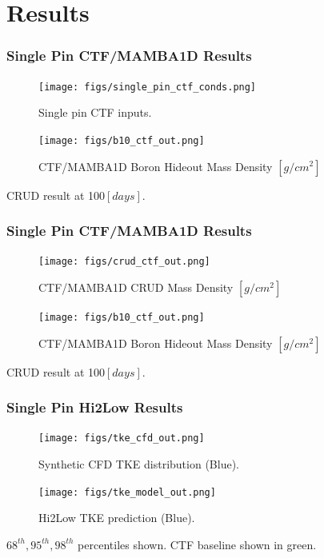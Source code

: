\documentclass[t, pdftex]{beamer}
\begin{document}
\section{Results}
\begin{frame}\frametitle{Single Pin CTF/MAMBA1D Results}
    \begin{figure}
        \centering
        \begin{minipage}{.5\textwidth}
            \centering
            \texttt{[image: figs/single\_pin\_ctf\_conds.png]}
            \caption{Single pin CTF inputs.}
        \end{minipage}%
        \begin{minipage}{.5\textwidth}
            \centering
            \texttt{[image: figs/b10\_ctf\_out.png]}
            \caption{CTF/MAMBA1D Boron Hideout Mass Density $[g/cm^2]$}
        \end{minipage}
    \end{figure}
CRUD result at 100$[days]$.
\end{frame}

\begin{frame}\frametitle{Single Pin CTF/MAMBA1D Results}
    \begin{figure}
        \centering
        \begin{minipage}{.5\textwidth}
            \centering
            \texttt{[image: figs/crud\_ctf\_out.png]}
            \caption{CTF/MAMBA1D CRUD Mass Density $[g/cm^2]$}
        \end{minipage}%
        \begin{minipage}{.5\textwidth}
            \centering
            \texttt{[image: figs/b10\_ctf\_out.png]}
            \caption{CTF/MAMBA1D Boron Hideout Mass Density $[g/cm^2]$}
        \end{minipage}
    \end{figure}
CRUD result at 100$[days]$.
\end{frame}

\begin{frame}\frametitle{Single Pin Hi2Low Results}
    \begin{figure}
        \centering
        \begin{minipage}{.5\textwidth}
            \centering
            \texttt{[image: figs/tke\_cfd\_out.png]}
            \caption{Synthetic CFD TKE distribution (Blue).}
        \end{minipage}%
        \begin{minipage}{.5\textwidth}
            \centering
            \texttt{[image: figs/tke\_model\_out.png]}
            \caption{Hi2Low TKE prediction (Blue).}
        \end{minipage}
    \end{figure}
$68^{th}, 95^{th}, 98^{th}$ percentiles shown.
CTF baseline shown in green.
\end{frame}
\end{document}
